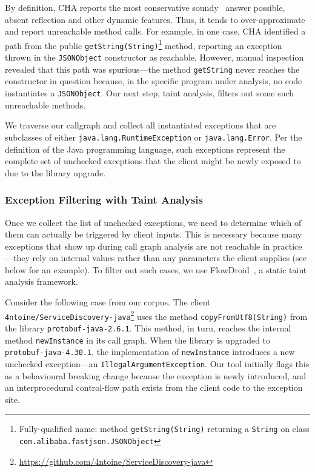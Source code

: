 By definition, CHA reports the most conservative soundy~\cite{livshits15:_in} answer possible, absent reflection and other dynamic features. Thus, it tends to over-approximate and report unreachable method calls. For example, in one case, CHA identified a path from the public \texttt{getString(String)}\footnote{Fully-qualified name: method \texttt{getString(String)} returning a \texttt{String} on class \texttt{com.alibaba.fastjson.JSONObject}} method, reporting an exception thrown in the \texttt{JSONObject} constructor as reachable. However, manual inspection revealed that this path was spurious—the method \texttt{getString} never reaches the constructor in question because, in the specific program under analysis, no code instantiates a \texttt{JSONObject}. Our next step, taint analysis, filters out some such unreachable methods.


We traverse our callgraph and collect all instantiated exceptions that are subclasses of either \texttt{java.lang.RuntimeException} or \texttt{java.lang.Error}. Per the definition of the Java programming language, such exceptions represent the complete set of unchecked exceptions that the client might be newly exposed to due to the library upgrade.

\subsubsection{Exception Filtering with Taint Analysis}

Once we collect the list of unchecked exceptions, we need to determine which of them can actually be triggered by client inputs. This is necessary because many exceptions that show up during call graph analysis are not reachable in practice—they rely on internal values rather than any parameters the client supplies (see below for an example). To filter out such cases, we use FlowDroid~\cite{Arzt14:_flowdroid}, a static taint analysis framework.

Consider the following case from our corpus. The client \texttt{4ntoine/ServiceDiscovery-java}\footnote{\url{https://github.com/4ntoine/ServiceDiscovery-java}} uses the method \texttt{copyFromUtf8(String)} from the library \texttt{protobuf-java-2.6.1}. This method, in turn, reaches the internal method \texttt{newInstance} in its call graph. When the library is upgraded to \texttt{protobuf-java-4.30.1}, the implementation of \texttt{newInstance} introduces a new unchecked exception—an \texttt{IllegalArgumentException}. Our tool initially flags this as a behavioural breaking change because the exception is newly introduced, and an interprocedural control-flow path exists from the client code to the exception site.

